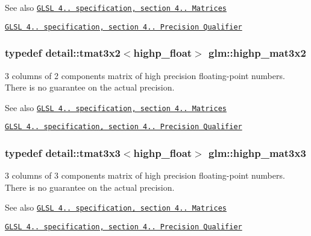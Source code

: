 \begin{DoxySeeAlso}{See also}
\href{http://www.opengl.org/registry/doc/GLSLangSpec.4.20.8.pdf}{\tt G\+L\+S\+L 4.. specification, section 4.. Matrices} 

\href{http://www.opengl.org/registry/doc/GLSLangSpec.4.20.8.pdf}{\tt G\+L\+S\+L 4.. specification, section 4.. Precision Qualifier} 
\end{DoxySeeAlso}
\hypertarget{group__core__precision_gae46e3b35f72ae06bc7d38ff29a189cfb}{}
\subsubsection[{highp\+\_\+mat3x2}]{\setlength{\rightskip}{0pt plus 5cm}typedef detail\+::tmat3x2$<$highp\+\_\+float$>$ {\bf glm\+::highp\+\_\+mat3x2}}\label{group__core__precision_gae46e3b35f72ae06bc7d38ff29a189cfb}
3 columns of 2 components matrix of high precision floating-\/point numbers. There is no guarantee on the actual precision.

\begin{DoxySeeAlso}{See also}
\href{http://www.opengl.org/registry/doc/GLSLangSpec.4.20.8.pdf}{\tt G\+L\+S\+L 4.. specification, section 4.. Matrices} 

\href{http://www.opengl.org/registry/doc/GLSLangSpec.4.20.8.pdf}{\tt G\+L\+S\+L 4.. specification, section 4.. Precision Qualifier} 
\end{DoxySeeAlso}
\hypertarget{group__core__precision_ga072d1e03e15a20a108632540802c9a7d}{}
\subsubsection[{highp\+\_\+mat3x3}]{\setlength{\rightskip}{0pt plus 5cm}typedef detail\+::tmat3x3$<$highp\+\_\+float$>$ {\bf glm\+::highp\+\_\+mat3x3}}\label{group__core__precision_ga072d1e03e15a20a108632540802c9a7d}
3 columns of 3 components matrix of high precision floating-\/point numbers. There is no guarantee on the actual precision.

\begin{DoxySeeAlso}{See also}
\href{http://www.opengl.org/registry/doc/GLSLangSpec.4.20.8.pdf}{\tt G\+L\+S\+L 4.. specification, section 4.. Matrices} 

\href{http://www.opengl.org/registry/doc/GLSLangSpec.4.20.8.pdf}{\tt G\+L\+S\+L 4.. specification, section 4.. Precision Qualifier} 
\end{DoxySeeAlso}
\hypertarget{group__core__precision_ga55fe92f6217fa20816f52f748fb399c7}{}
